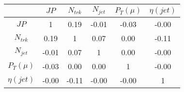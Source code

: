 \begin{tabular}{|c|c|c|c|c|c|} 
\hline
 & $JP$ & $N_{trk}$ & $N_{jet}$ & $P_{T} (\mu)$ & $\eta (jet)$ \\ \hline
$JP$ & 1 & 0.19 & -0.01 & -0.03 & -0.00 \\
$N_{trk}$ & 0.19 & 1 & 0.07 & 0.00 & -0.11 \\
$N_{jet}$ & -0.01 & 0.07 & 1 & 0.00 & -0.00 \\
$P_{T} (\mu)$ & -0.03 & 0.00 & 0.00 & 1 & -0.00 \\
$\eta (jet)$ & -0.00 & -0.11 & -0.00 & -0.00 & 1 \\
\hline 
\end{tabular} 


